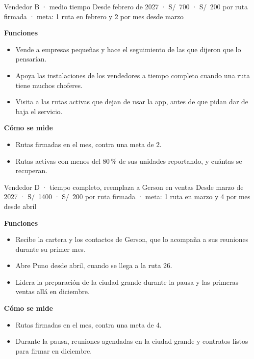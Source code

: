 \documentclass[10.5pt,a4paper]{article}
\begin{document}
\begin{rol}{Vendedor B · medio tiempo}
{\small\color{tenue}Desde febrero de 2027 · S/~700 · S/~200 por ruta firmada · meta: 1 ruta en febrero y 2 por mes desde marzo}\par\vspace{3pt}
\begin{minipage}[t]{0.52\linewidth}\small\textbf{\color{marca}Funciones}
\begin{itemize}
\item Vende a empresas pequeñas y hace el seguimiento de las que dijeron que lo pensarían.
\item Apoya las instalaciones de los vendedores a tiempo completo cuando una ruta tiene muchos choferes.
\item Visita a las rutas activas que dejan de usar la app, antes de que pidan dar de baja el servicio.
\end{itemize}\end{minipage}\hfill
\begin{minipage}[t]{0.44\linewidth}\small\textbf{\color{marca}Cómo se mide}
\begin{itemize}
\item Rutas firmadas en el mes, contra una meta de 2.
\item Rutas activas con menos del 80\,\% de sus unidades reportando, y cuántas se recuperan.
\end{itemize}\end{minipage}
\end{rol}

\begin{rol}{Vendedor D · tiempo completo, reemplaza a Gerson en ventas}
{\small\color{tenue}Desde marzo de 2027 · S/~1400 · S/~200 por ruta firmada · meta: 1 ruta en marzo y 4 por mes desde abril}\par\vspace{3pt}
\begin{minipage}[t]{0.52\linewidth}\small\textbf{\color{marca}Funciones}
\begin{itemize}
\item Recibe la cartera y los contactos de Gerson, que lo acompaña a sus reuniones durante su primer mes.
\item Abre Puno desde abril, cuando se llega a la ruta 26.
\item Lidera la preparación de la ciudad grande durante la pausa y las primeras ventas allá en diciembre.
\end{itemize}\end{minipage}\hfill
\begin{minipage}[t]{0.44\linewidth}\small\textbf{\color{marca}Cómo se mide}
\begin{itemize}
\item Rutas firmadas en el mes, contra una meta de 4.
\item Durante la pausa, reuniones agendadas en la ciudad grande y contratos listos para firmar en diciembre.
\end{itemize}\end{minipage}
\end{rol}
\end{document}
